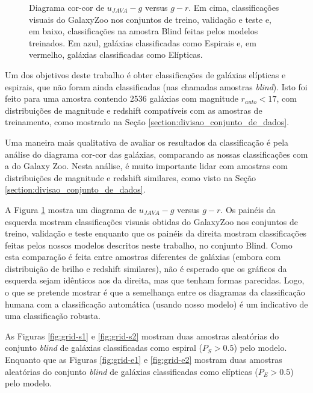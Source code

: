 \begin{figure}[!ht]
\begin{subfigure}{.57\linewidth}
  \end{subfigure}
  \caption{Diagrama cor-cor de $u_{JAVA} - g$ versus $g - r$. Em cima, classificações visuais do GalaxyZoo nos conjuntos de treino, validação e teste e, em baixo, classificações na amostra Blind feitas pelos modelos treinados. Em azul, galáxias classificadas como Espirais e, em vermelho, galáxias classificadas como Elípticas.}%
  \label{fig:color-color}%
\end{figure}

Um dos objetivos deste trabalho é obter classificações de galáxias elípticas e espirais, que não foram ainda classificadas (nas chamadas amostras \emph{blind}). Isto foi feito para uma amostra contendo 2536 galáxias com magnitude $r_{auto} < 17$, com distribuições de magnitude e redshift compatíveis com as amostras de treinamento, como mostrado na Seção \ref{section:divisao_conjunto_de_dados}.

Uma maneira mais qualitativa de avaliar os resultados da classificação é pela análise do diagrama cor-cor das galáxias, comparando as nossas classificações com a do Galaxy Zoo. Nesta análise, é muito importante lidar com  amostras com distribuições de magnitude e redshift similares, como visto na Seção \ref{section:divisao_conjunto_de_dados}.

A Figura \ref{fig:color-color} mostra um diagrama de $u_{JAVA} - g$ versus $g - r$. Os painéis da esquerda mostram classificações visuais obtidas do GalaxyZoo nos conjuntos de treino, validação e teste enquanto que os painéis da direita mostram classificações feitas pelos nossos modelos descritos neste trabalho, no conjunto Blind. Como esta comparação é feita entre amostras diferentes de galáxias (embora com distribuição de brilho e redshift similares), não é esperado que os gráficos da esquerda sejam idênticos aos da direita, mas que tenham formas parecidas. Logo, o que se pretende mostrar é que a semelhança entre os diagramas da classificação humana com a classificação automática (usando nosso modelo) é um indicativo de uma classificação robusta.

As Figuras \ref{fig:grid-s1} e \ref{fig:grid-s2} mostram duas amostras aleatórias do conjunto \emph{blind} de galáxias classificadas como espiral ($P_S > 0.5$) pelo modelo. Enquanto que as Figuras \ref{fig:grid-e1} e \ref{fig:grid-e2} mostram duas amostras aleatórias do conjunto \emph{blind} de galáxias classificadas como elípticas ($P_E > 0.5$) pelo modelo.

\newpage

